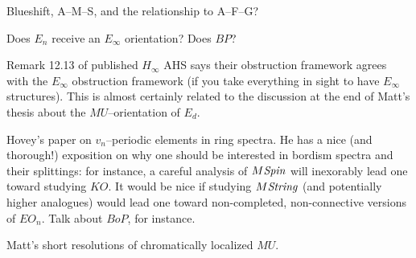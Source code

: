 Blueshift, A--M--S, and the relationship to A--F--G?

Does $E_n$ receive an $E_\infty$ orientation?  Does $BP$?

Remark 12.13 of published $H_\infty$ AHS says their obstruction framework agrees with the $E_\infty$ obstruction framework (if you take everything in sight to have $E_\infty$ structures).  This is almost certainly related to the discussion at the end of Matt's thesis about the $MU$--orientation of $E_d$.

Hovey's paper on $v_n$--periodic elements in ring spectra.  He has a nice (and thorough!) exposition on why one should be interested in bordism spectra and their splittings: for instance, a careful analysis of $M\mathit{Spin}$ will inexorably lead one toward studying $KO$.  It would be nice if studying $M\mathit{String}$ (and potentially higher analogues) would lead one toward non-completed, non-connective versions of $EO_n$.  Talk about $BoP$, for instance.

Matt's short resolutions of chromatically localized $MU$.
